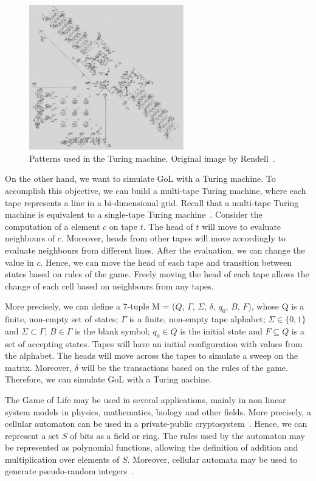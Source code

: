 \documentclass[12pt]{article}
\begin{document}
\begin{figure}[h]
    \centering
    \includegraphics[width=0.6\textwidth]{images/gol-tm.pdf}
    \caption{Patterns used in the Turing machine. Original image by
        Rendell~\cite{Rendell:inproc:2011:jul}.}\label{fig:gol_mt}
\end{figure}

On the other hand, we want to simulate GoL with a Turing machine. To accomplish
this objective, we can build a multi-tape Turing machine, where each tape
represents a line in a bi-dimensional grid. Recall that a multi-tape Turing
machine is equivalent to a single-tape Turing machine~\cite[Theorem
3.13]{Sipser:book:2012}. Consider the computation of a element $c$ on tape $t$.
The head of $t$ will move to evaluate neighbours of $c$. Moreover, heads from
other tapes will move accordingly to evaluate neighbours from different lines.
After the evaluation, we can change the value in $c$. Hence, we can move the
head of each tape and transition between states based on rules of the game.
Freely moving the head of each tape allows the change of each cell based on
neighbours from any tapes.

More precisely, we can define a 7-tuple M = ($Q$, $\Gamma$, $\Sigma$, $\delta$,
$q_0$, $B$, $F$), whose Q is a finite, non-empty set of states; $\Gamma$ is a
finite, non-empty tape alphabet; $\Sigma \in \{0, 1\}$ and $\Sigma \subset
\Gamma$; $B \in \Gamma$ is the blank symbol; $q_0 \in Q$ is the initial state
and $F \subseteq Q$ is a set of accepting states. Tapes will have an initial
configuration with values from the alphabet. The heads will move across the
tapes to simulate a sweep on the matrix. Moreover, $\delta$ will be the
transactions based on the rules of the game. Therefore, we can simulate GoL
with a Turing nachine.

The Game of Life may be used in several applications, mainly in non linear
system models in physics, mathematics, biology and other fields. More
precisely, a cellular automaton can be used in a private-public
cryptosystem~\cite{Guan:article:1987:feb}. Hence, we can represent a set $S$ of
bits as a field or ring. The rules used by the automaton may be represented as
polynomial functions, allowing the definition of addition and multiplication
over elements of $S$. Moreover, cellular automata may be used to generate
pseudo-random integers~\cite{Wolfram:article:1986:jun}.
\end{document}
